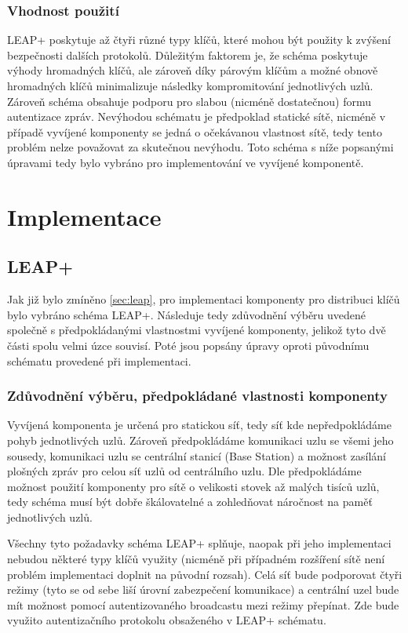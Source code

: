 \documentclass[11pt,final,twoside]{fithesis2}
\begin{document}
\subsection{Vhodnost použití}
LEAP+ poskytuje až čtyři různé typy klíčů, které mohou být použity k zvýšení bezpečnosti dalších protokolů. Důležitým faktorem je, že schéma poskytuje výhody hromadných klíčů, ale zároveň díky 
párovým klíčům a možné obnově hromadných klíčů minimalizuje následky kompromitování jednotlivých uzlů. Zároveň schéma obsahuje podporu pro slabou (nicméně dostatečnou) formu autentizace zpráv. 
Nevýhodou schématu je předpoklad statické sítě, nicméně v případě vyvíjené komponenty se jedná o očekávanou vlastnost sítě, tedy tento problém nelze považovat za skutečnou nevýhodu. Toto 
schéma s níže popsanými úpravami tedy bylo vybráno pro implementování ve vyvíjené komponentě.

\chapter{Implementace}

\section{LEAP+}
Jak již bylo zmíněno \ref{sec:leap}, pro implementaci komponenty pro distribuci klíčů bylo vybráno schéma LEAP+. Následuje tedy zdůvodnění výběru uvedené společně s předpokládanými vlastnostmi 
vyvíjené komponenty, jelikož tyto dvě části spolu velmi úzce souvisí. Poté jsou popsány úpravy oproti původnímu schématu provedené při implementaci. 
\subsection{Zdůvodnění výběru, předpokládané vlastnosti komponenty}

Vyvíjená komponenta je určená pro statickou síť, tedy síť kde nepředpokládáme pohyb jednotlivých uzlů. Zároveň předpokládáme komunikaci uzlu se všemi jeho sousedy, komunikaci uzlu se centrální stanicí 
(Base Station) a možnost zasílání plošných zpráv pro celou síť uzlů od centrálního uzlu. Dle předpokládáme možnost použití komponenty pro sítě o velikosti stovek až malých tisíců uzlů, tedy schéma musí 
být dobře škálovatelné a zohledňovat náročnost na paměť jednotlivých uzlů. 

Všechny tyto požadavky schéma LEAP+ splňuje, naopak při jeho implementaci nebudou některé typy klíčů využity (nicméně při případném rozšíření sítě není problém implementaci doplnit na původní rozsah). 
Celá síť bude podporovat čtyři režimy (tyto se od sebe liší úrovní zabezpečení komunikace) a centrální uzel bude mít možnost pomocí autentizovaného broadcastu mezi režimy přepínat. Zde bude využito 
autentizačního protokolu obsaženého v LEAP+ schématu. 
\end{document}
